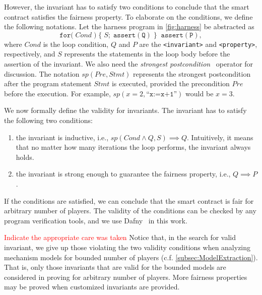 However, the invariant has to satisfy two conditions to conclude that the smart contract satisfies
the fairness property.
To elaborate on the conditions, we define the following notations.
Let the harness program in \cref{fig:harness} be abstracted as%
\[\mathtt{for(} \; Cond \; \mathtt{)} \; \{ \; S ; \; \mathtt{assert(Q)} \; \} \;\;
\mathtt{assert(P)},\]%
where $Cond$ is the loop condition, $Q$ and $P$ are the \texttt{<invariant>} and
\texttt{<property>}, respectively, and $S$ represents the statements in the loop body before the
assertion of the invariant.
We also need the \emph{strongest postcondition}~\cite{DS90} operator for discussion.
The notation $sp(Pre, Stmt)$ represents the strongest postcondition after the program statement
$Stmt$ is executed, provided the precondition $Pre$ before the execution.
For example, $sp(x=2, \texttt{``x:=x+1''})$ would be $x=3$.

We now formally define the validity for invariants.
The invariant has to satisfy the following two conditions:
\begin{enumerate}
  \item the invariant is inductive, i.e., $sp(Cond \wedge Q, S) \implies Q$.
    Intuitively, it means that no matter how many iterations the loop performs, the invariant
    always holds.
  \item the invariant is strong enough to guarantee the fairness property, i.e., $Q \implies P$.
\end{enumerate}

If the conditions are satisfied, we can conclude that the smart contract is fair for arbitrary
number of players.
The validity of the conditions can be checked by any program verification tools, and we use
Dafny~\cite{dafny} in this work.


\textcolor{red}{Indicate the appropriate care was taken}
Notice that, in the search for valid invariant, we give up those violating the two validity
conditions when analyzing mechanism models for bounded number of players (c.f.
\cref{subsec:ModelExtraction}).
That is, only those invariants that are valid for the bounded models are considered in proving for
arbitrary number of players.
More fairness properties may be proved when customized invariants are provided.


